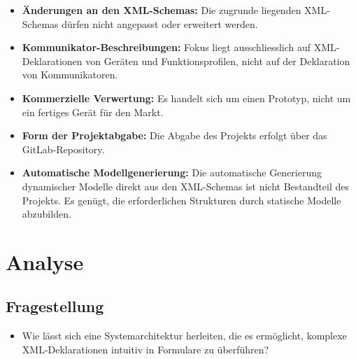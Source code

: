 \documentclass[a4paper,12pt]{article}
\begin{document}
\begin{itemize}
  \item \textbf{Änderungen an den XML-Schemas:}  
    Die zugrunde liegenden XML-Schemas dürfen nicht angepasst oder erweitert werden.  

  \item \textbf{Kommunikator-Beschreibungen:}  
    Fokus liegt ausschliesslich auf XML-Deklarationen von Geräten und Funktionsprofilen, nicht auf der Deklaration von Kommunikatoren.  

  \item \textbf{Kommerzielle Verwertung:}  
    Es handelt sich um einen Prototyp, nicht um ein fertiges Gerät für den Markt.  

  \item \textbf{Form der Projektabgabe:}  
    Die Abgabe des Projekts erfolgt über das GitLab-Repository.

  \item \textbf{Automatische Modellgenerierung:}  
    Die automatische Generierung dynamischer Modelle direkt aus den XML-Schemas ist nicht Bestandteil des Projekts. 
    Es genügt, die erforderlichen Strukturen durch statische Modelle abzubilden.
\end{itemize}


\section{Analyse}
\subsection{Fragestellung}

\begin{itemize}
  \item Wie lässt sich eine Systemarchitektur herleiten, die es ermöglicht, komplexe XML-Deklarationen intuitiv in Formulare zu überführen?
\end{itemize}
\end{document}
